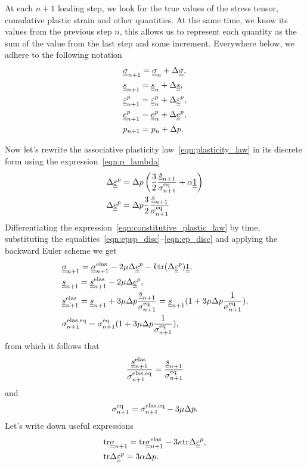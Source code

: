 \documentclass[12pt]{article}
\begin{document}
\begin{appendices}
    At each $n+1$ loading step, we look for the true values of the stress tensor, cumulative plastic strain and other quantities. At the same time, we know its values from the previous step $n$, this allows us to represent each quantity as the sum of the value from the last step and some increment. Everywhere below, we adhere to the following notation
    \begin{align*}
        & \underline{\underline{\sigma}}_{n+1} = \underline{\underline{\sigma}}_n + \Delta\underline{\underline{\sigma}}, \\
        & \underline{\underline{s}}_{n+1} = \underline{\underline{s}}_n + \Delta\underline{\underline{s}}, \\
        & \underline{\underline{\varepsilon}}^p_{n+1} = \underline{\underline{\varepsilon}}^p_{n} + \Delta\underline{\underline{\varepsilon}}^p, \\
        & \underline{\underline{e}}^p_{n+1} = \underline{\underline{e}}^p_{n} + \Delta\underline{\underline{e}}^p, \\
        & p_{n+1} = p_n + \Delta p.
    \end{align*}

    Now let's rewrite the associative plasticity law~\eqref{eqn:plasticity_law} in its discrete form using the expression~\eqref{eqn:p_lambda} 
    \begin{align}
        & \Delta\underline{\underline{\varepsilon}}^p= \Delta p \left( \frac{3}{2} \frac{\underline{\underline{s}}_{n+1}}{\sigma_{n+1}^\text{eq}} + \alpha \underline{\underline{1}} \right) \label{eqn:epsp_disc}\\
        & \Delta\underline{\underline{e}}^p = \Delta p \frac{3}{2} \frac{\underline{\underline{s}}_{n+1}}{\sigma_{n+1}^\text{eq}} \label{eqn:ep_disc}
    \end{align}
    Differentiating the expression~\eqref{eqn:constitutive_plastic_law} by time, substituting the equalities~\eqref{eqn:epsp_disc}--\eqref{eqn:ep_disc} and applying the backward Euler scheme we get 
    \begin{align}
        & \underline{\underline{\sigma}}_{n+1} = \underline{\underline{\sigma}}_{n+1}^\text{elas} - 2\mu \Delta\underline{\underline{e}}^p - k \mathrm{tr} (\Delta\underline{\underline{\varepsilon}}^p) \underline{\underline{1}}, \label{eqn:sigma_disc}\\
        & \underline{\underline{s}}_{n+1} = \underline{\underline{s}}_{n+1}^\text{elas} - 2\mu\Delta\underline{\underline{e}}^p, \\
        & \underline{\underline{s}}_{n+1}^\text{elas} = \underline{\underline{s}}_{n+1} + 3\mu\Delta p \frac{\underline{\underline{s}}_{n+1}}{\sigma_{n+1}^\text{eq}} = \underline{\underline{s}}_{n+1} (1 +  3\mu\Delta p \frac{1}{\sigma_{n+1}^\text{eq}}), \\
        & \sigma_{n+1}^\text{elas,eq} = \sigma_{n+1}^\text{eq} (1 +  3\mu\Delta p \frac{1}{\sigma_{n+1}^\text{eq}}),
    \end{align}
    from which it follows that
    \begin{equation}
        \frac{\underline{\underline{s}}_{n+1}^\text{elas}}{\sigma_{n+1}^\text{elas,eq}} = \frac{\underline{\underline{s}}_{n+1}}{\sigma_{n+1}^\text{eq}}
    \end{equation}
    and 
    \begin{equation}\label{eqn:sigmaeqn_disc}
        \sigma_{n+1}^\text{eq} = \sigma_{n+1}^\text{elas,eq} - 3\mu\Delta p.
    \end{equation} 
    Let's write down useful expressions   
    \begin{align}
        & \mathrm{tr} \underline{\underline{\sigma}}_{n+1} = \mathrm{tr} \underline{\underline{\sigma}}_{n+1}^{\text{elas}} - 3\kappa \mathrm{tr} \Delta\underline{\underline{\varepsilon}}^p, \label{eqn:tr_sigman}\\
        & \mathrm{tr} \Delta\underline{\underline{\varepsilon}}^p= 3\alpha \Delta p. \label{eqn:tr_delta_eps_p}
    \end{align}


\end{appendices}
\end{document}
